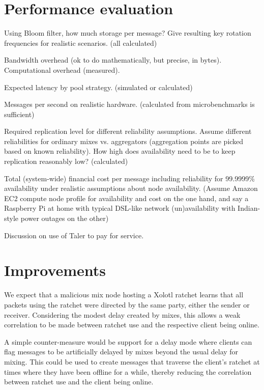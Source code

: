\documentclass[twoside,letterpaper]{llncs}
\begin{document}
\section{Performance evaluation}

Using Bloom filter, how much storage per message?
Give resulting key rotation frequencies for realistic
scenarios. (all calculated)

Bandwidth overhead (ok to do mathematically, but precise,
in bytes).  Computational overhead (measured).

Expected latency by pool strategy. (simulated or calculated)

Messages per second on realistic hardware. (calculated from
microbenchmarks is sufficient)

Required replication level for different reliability assumptions.
Assume different reliabilities for ordinary mixes vs. aggregators
(aggregation points are picked based on known reliability).  How high
does availability need to be to keep replication reasonably low?
(calculated)

Total (system-wide) financial cost per message including reliability
for 99.9999\% availability under realistic assumptions about node
availability. (Assume Amazon EC2 compute node profile for availability
and cost on the one hand, and say a Raspberry Pi at home with typical
DSL-like network (un)availability with Indian-style power outages on
the other)

Discussion on use of Taler to pay for service.



\section{Improvements}

We expect that a malicious mix node hosting a Xolotl ratchet learns
that all packets using the ratchet were directed by the same party,
either the sender or receiver.  Considering the modest delay created
by mixes, this allows a weak correlation to be made between ratchet
use and the respective client being online.

A simple counter-measure would be support for a delay mode where
clients can flag messages to be artificially delayed by mixes beyond
the usual delay for mixing.  This could be used to create messages
that traverse the client's ratchet at times where they have been
offline for a while, thereby reducing the correlation between ratchet
use and the client being online.
\end{document}
